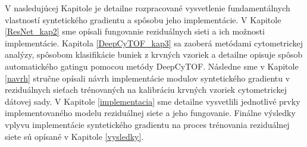 V nasledujúcej Kapitole je detailne rozpracované vysvetlenie fundamentálnych vlastností syntetického gradientu a spôsobu jeho implementácie. V Kapitole \ref{ResNet_kap2} sme opísali fungovanie reziduálnych sieti a ich možnosti implementácie. Kapitola \ref{DeepCyTOF_kap3} sa zaoberá metódami cytometrickej analýzy, spôsobom klasifikácie buniek z krvných vzoriek a detailne opisuje spôsob automatického gatingu pomocou metódy DeepCyTOF. Následne sme v Kapitole \ref{navrh} stručne opísali návrh implementácie modulov syntetického gradientu v reziduálnych sieťach trénovaných na kalibráciu krvných vzoriek cytometrickej dátovej sady. V Kapitole \ref{implementacia} sme detailne vysvetlili jednotlivé prvky implementovaného modelu reziduálnej siete a jeho fungovanie. Finálne výsledky vplyvu implementácie syntetického gradientu na proces trénovania reziduálnej siete sú opísané v Kapitole \ref{vysledky}.
